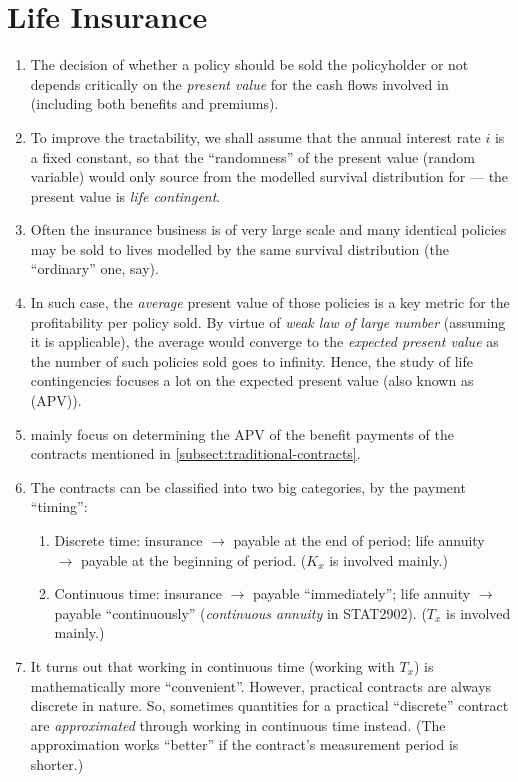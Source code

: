 \section{Life Insurance}
\label{sect:life-insurance}
\begin{enumerate}
\item The decision of whether a policy  should be sold the
policyholder  or not depends critically on the \emph{present
value} for the cash flows involved in  (including both
benefits and premiums).
\item To improve the tractability, we shall assume that the annual interest
rate \(i\) is a fixed constant, so that the ``randomness'' of the present value
(random variable) would only source from the modelled survival distribution for
 --- the present value is \emph{life contingent}.
\item Often the insurance business  is of very
large scale and many identical policies may be sold to lives modelled by the
same survival distribution (the ``ordinary'' one, say).
\item In such case, the \emph{average} present value of those policies is a
key metric for the profitability per policy sold. By virtue of \emph{weak
law of large number} (assuming it is applicable), the average would converge to
the \emph{expected present value} as the number of such policies sold
goes to infinity. Hence, the study of life contingencies focuses a lot on the
expected present value (also known as  (APV)).
\item {} mainly focus on determining
the APV of the benefit payments of the contracts mentioned in
\cref{subsect:traditional-contracts}.
\item The contracts can be classified into two big categories, by the payment
``timing'':
\begin{enumerate}
\item Discrete time: insurance \(\rightarrow\) payable at the end of period;
life annuity \(\rightarrow\) payable at the beginning of period. (\(K_x\) is
involved mainly.)
\item Continuous time: insurance \(\rightarrow\) payable ``immediately''; life
annuity \(\rightarrow\) payable ``continuously'' (\emph{continuous annuity} in
STAT2902). (\(T_x\) is involved mainly.)
\end{enumerate}

\item It turns out that working in continuous time (working with \(T_x\)) is
mathematically more ``convenient''. However, practical contracts are always
discrete in nature. So, sometimes quantities for a practical ``discrete''
contract are \emph{approximated} through working in continuous time instead.
(The approximation works ``better'' if the contract's measurement period is
shorter.)


\end{enumerate}
